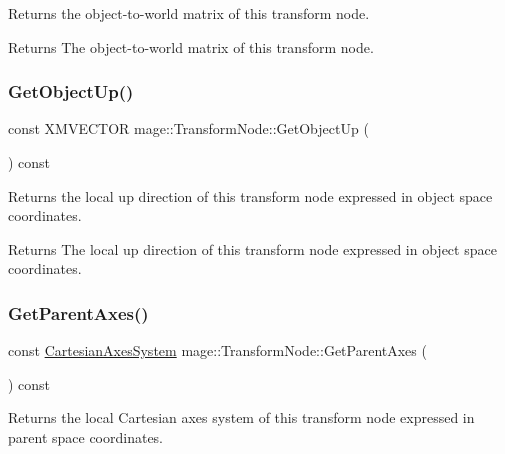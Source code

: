 Returns the object-\/to-\/world matrix of this transform node.

\begin{DoxyReturn}{Returns}
The object-\/to-\/world matrix of this transform node. 
\end{DoxyReturn}
\hypertarget{structmage_1_1_transform_node_ab045712f4aa08651b2a43b1883e8c3fc}{}\label{structmage_1_1_transform_node_ab045712f4aa08651b2a43b1883e8c3fc} 
\subsubsection{\texorpdfstring{Get\+Object\+Up()}{GetObjectUp()}}
{\footnotesize\ttfamily const X\+M\+V\+E\+C\+T\+OR mage\+::\+Transform\+Node\+::\+Get\+Object\+Up (\begin{DoxyParamCaption}{ }\end{DoxyParamCaption}) const\hspace{0.3cm}{\ttfamily [noexcept]}}

Returns the local up direction of this transform node expressed in object space coordinates.

\begin{DoxyReturn}{Returns}
The local up direction of this transform node expressed in object space coordinates. 
\end{DoxyReturn}
\hypertarget{structmage_1_1_transform_node_a65a2b2cef7a43dfce2e523f78d5eeb13}{}\label{structmage_1_1_transform_node_a65a2b2cef7a43dfce2e523f78d5eeb13} 
\subsubsection{\texorpdfstring{Get\+Parent\+Axes()}{GetParentAxes()}}
{\footnotesize\ttfamily const \hyperlink{structmage_1_1_cartesian_axes_system}{Cartesian\+Axes\+System} mage\+::\+Transform\+Node\+::\+Get\+Parent\+Axes (\begin{DoxyParamCaption}{ }\end{DoxyParamCaption}) const\hspace{0.3cm}{\ttfamily [noexcept]}}

Returns the local Cartesian axes system of this transform node expressed in parent space coordinates.

